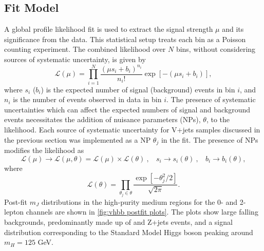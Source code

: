 \subsection{Fit Model}
A global profile likelihood fit is used to extract the signal strength $\mu$ and its significance from the data. This statistical setup treats each bin as a Poisson counting experiment. The combined likelihood over $N$ bins, without considering sources of systematic uncertainty, is given by
%
\begin{equation}
    \mathcal{L}(\mu) = \prod_{i=1}^N \frac{(\mu s_i + b_i)^{n_i}}{n_i!} \exp \left[ - (\mu s_i + b_i) \right],
\end{equation}
%
where $s_i$ ($b_i$) is the expected number of signal (background) events in bin $i$, and $n_i$ is the number of events observed in data in bin $i$. The presence of systematic uncertainties which can affect the expected numbers of signal and background events necessitates the addition of nuisance parameters (NPs), $\theta$, to the likelihood. Each source of systematic uncertainty for V+jets samples discussed in the previous section was implemented as a NP $\theta_j$ in the fit. The presence of NPs modifies the likelihood as 
%
\begin{equation}
    \mathcal{L}(\mu) \rightarrow \mathcal{L}(\mu, \theta) = \mathcal{L}(\mu) \times \mathcal{L}(\theta) ~,~~~~ s_i \rightarrow s_i(\theta) ~,~~~~ b_i \rightarrow b_i(\theta),
\end{equation}
%
where
%
\begin{equation}
    \mathcal{L}(\theta) = \prod_{\theta_j \in \theta} \frac{\exp\left[{-\theta_j^2/2}\right]}{\sqrt{2\pi}}.
\end{equation}
%
Post-fit $m_J$ distributions in the high-purity medium \pTV regions for the 0- and 2-lepton channels are shown in \cref{fig:vhbb postfit plots}. The plots show large falling backgrounds, predominantly made up of \Wjets and Z+jets events, and a signal distribution corresponding to the Standard Model Higgs boson peaking around $m_H = 125$ GeV.
%

